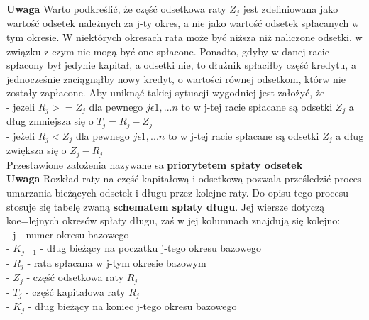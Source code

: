 \documentclass{article}
\begin{document}
\textbf{Uwaga} Warto podkreślić, że część odsetkowa raty $ Z_j $ jest zdefiniowana jako wartość odsetek należnych za j-ty okres, a nie jako wartość odsetek spłacanych w tym okresie. W niektórych okresach rata może być niższa niż naliczone odsetki, w związku z czym nie mogą być one spłacone. Ponadto, gdyby w danej racie spłacony był jedynie kapitał, a odsetki nie, to dłużnik spłaciłby część kredytu, a jednocześnie zaciągnąłby nowy kredyt, o wartości równej odsetkom, którw nie zostały zapłacone. Aby uniknąć takiej sytuacji wygodniej jest założyć, że \\

- jezeli $ R_j >= Z_j $ dla pewnego $ j \epsilon {1,...n} $ to w j-tej racie spłacane są odsetki $ Z_j $ a dług zmniejsza się o $ T_j = R_j - Z_j $\\
- jeżeli $ R_j < Z_j $ dla pewnego $ j \epsilon {1,...n} $ to w j-tej racie spłacane są odsetki $ Z_j $ a dług zwiększa się o $ Z_j - R_j $\\

Przestawione założenia nazywane sa \textbf{priorytetem spłaty odsetek}\\

\textbf{Uwaga} Rozkład raty na część kapitałową i odsetkową pozwala prześledzić proces umarzania bieżących odsetek i długu przez kolejne raty. Do opisu tego procesu stosuje się tabelę zwaną \textbf{schematem spłaty długu}. Jej wiersze dotyczą koe=lejnych okresów spłaty długu, zaś w jej kolumnach znajdują się kolejno:\\

- j - numer okresu bazowego\\
- $ K_{j-1} $ - dług bieżący na poczatku j-tego okresu bazowego\\
- $ R_j $ - rata spłacana w j-tym okresie bazowym\\
- $ Z_j $ - część odsetkowa raty $ R_j $\\
- $ T_j $ - część kapitałowa raty $ R_j $\\
- $ K_j $ - dług bieżący na koniec j-tego okresu bazowego\\
\end{document}
